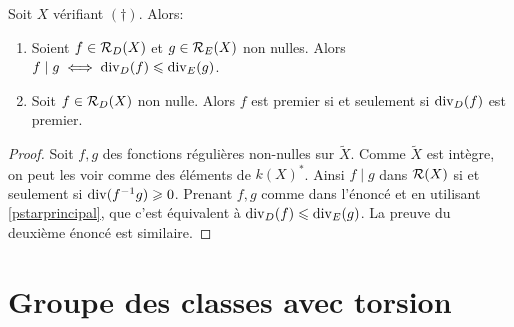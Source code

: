 \begin{prop}
Soit $X$ vérifiant $(\dagger)$. Alors:
\begin{enumerate}
\item Soient $f\in \mathcal{R}_D(X)$ et $g\in \mathcal{R}_E(X)$ non nulles. Alors $f\mid g\iff \operatorname{div}_D(f)\leqslant\operatorname{div}_E(g)$.
\item Soit $f\in \mathcal{R}_D(X)$ non nulle. Alors $f$ est premier si et seulement si $\operatorname{div}_D(f)$ est premier.
\end{enumerate}
\end{prop}
\begin{proof}
Soit $f,g$ des fonctions régulières non-nulles sur $\widetilde{X}$. Comme $\widetilde{X}$ est intègre, on peut les voir comme des éléments de $k(X)^*$. Ainsi $f\mid g$ dans $\mathcal{R}(X)$ si et seulement si $\operatorname{div}(f^{-1}g)\geqslant 0$. Prenant $f,g$ comme dans l'énoncé et en utilisant \ref{pstarprincipal}, que c'est équivalent à $\operatorname{div}_D(f)\leqslant\operatorname{div}_E(g)$. La preuve du deuxième énoncé est similaire.
\end{proof}

\section{Groupe des classes avec torsion}
